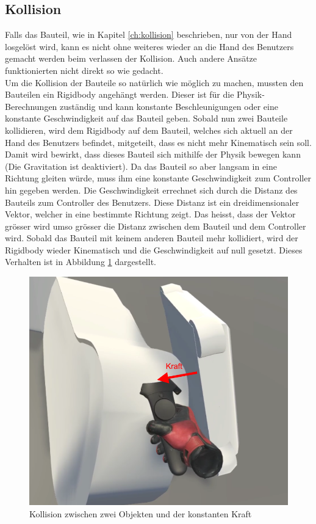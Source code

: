 \subsection{Kollision}
\label{ch:kollision_single_user}
Falls das Bauteil, wie in Kapitel \ref{ch:kollision} beschrieben, nur von der Hand losgelöst wird, kann es nicht ohne weiteres wieder an die Hand des Benutzers gemacht werden beim verlassen der Kollision. Auch andere Ansätze funktionierten nicht direkt so wie gedacht. \\

\noindent Um die Kollision der Bauteile so natürlich wie möglich zu machen, mussten den Bauteilen ein Rigidbody angehängt werden. Dieser ist für die Physik-Berechnungen zuständig und kann konstante Beschleunigungen oder eine konstante Geschwindigkeit auf das Bauteil geben. Sobald nun zwei Bauteile kollidieren, wird dem Rigidbody auf dem Bauteil, welches sich aktuell an der Hand des Benutzers befindet, mitgeteilt, dass es nicht mehr Kinematisch sein soll. Damit wird bewirkt, dass dieses Bauteil sich mithilfe der Physik bewegen kann (Die Gravitation ist deaktiviert). Da das Bauteil so aber langsam in eine Richtung gleiten würde, muss ihm eine konstante Geschwindigkeit zum Controller hin gegeben werden. Die Geschwindigkeit errechnet sich durch die Distanz des Bauteils zum Controller des Benutzers. Diese Distanz ist ein dreidimensionaler Vektor, welcher in eine bestimmte Richtung zeigt. Das heisst, dass der Vektor grösser wird umso grösser die Distanz zwischen dem Bauteil und dem Controller wird. Sobald das Bauteil mit keinem anderen Bauteil mehr kollidiert, wird der Rigidbody wieder Kinematisch und die Geschwindigkeit auf null gesetzt. Dieses Verhalten ist in Abbildung \ref{fig:collision} dargestellt.

\begin{figure}[h!]
	\centering
	\includegraphics[keepaspectratio,width=0.4\linewidth]{img/Kollision.PNG}
	\caption{Kollision zwischen zwei Objekten und der konstanten Kraft}
	\label{fig:collision}
\end{figure}

